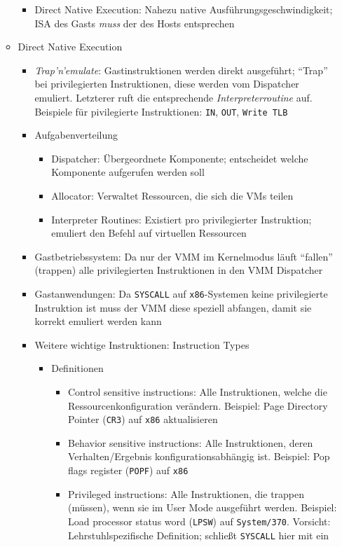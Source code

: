 \begin{itemize}
\begin{itemize}
\begin{itemize}
			\item Direct Native Execution: Nahezu native Ausführungsgeschwindigkeit; ISA des Gasts \textit{muss} der des Hosts entsprechen
		\end{itemize}
		\item Direct Native Execution
		\begin{itemize}
			\item \textit{Trap'n'emulate}: Gastinstruktionen werden direkt ausgeführt; "`Trap"' bei privilegierten Instruktionen, diese werden vom Dispatcher emuliert. Letzterer ruft die entsprechende \textit{Interpreterroutine} auf. Beispiele für pivilegierte Instruktionen: \texttt{IN}, \texttt{OUT}, \texttt{Write TLB}
			\item Aufgabenverteilung
			\begin{itemize}
				\item Dispatcher: Übergeordnete Komponente; entscheidet welche Komponente aufgerufen werden soll
				\item Allocator: Verwaltet Ressourcen, die sich die VMs teilen
				\item Interpreter Routines: Existiert pro privilegierter Instruktion; emuliert den Befehl auf virtuellen Ressourcen
			\end{itemize}
			\item Gastbetriebssystem: Da nur der VMM im Kernelmodus läuft "`fallen"' (trappen) alle privilegierten Instruktionen in den VMM Dispatcher
			\item Gastanwendungen: Da \texttt{SYSCALL} auf \texttt{x86}-Systemen keine privilegierte Instruktion ist muss der VMM diese speziell abfangen, damit sie korrekt emuliert werden kann
			\item Weitere wichtige Instruktionen: Instruction Types
			\begin{itemize}
				\item Definitionen
				\begin{itemize}
					\item Control sensitive instructions: Alle Instruktionen, welche die Ressourcenkonfiguration verändern. Beispiel: Page Directory Pointer (\texttt{CR3}) auf \texttt{x86} aktualisieren
					\item Behavior sensitive instructions: Alle Instruktionen, deren Verhalten/Ergebnis konfigurationsabhängig ist. Beispiel: Pop flags register (\texttt{POPF}) auf \texttt{x86}
					\item Privileged instructions: Alle Instruktionen, die trappen (müssen), wenn sie im User Mode ausgeführt werden. Beispiel: Load processor status word (\texttt{LPSW}) auf \texttt{System/370}. Vorsicht: Lehrstuhlspezifische Definition; schließt \texttt{SYSCALL} hier mit ein

\end{itemize}
\end{itemize}
\end{itemize}
\end{itemize}
\end{itemize}
